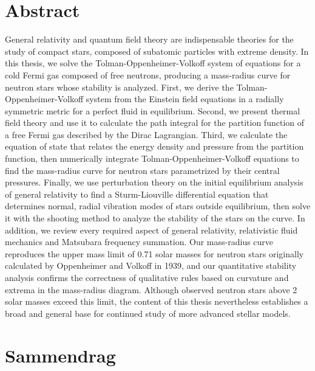 \chapter*{Abstract}

General relativity and quantum field theory are indispensable theories for the study of compact stars, composed of subatomic particles with extreme density.
In this thesis, we solve the Tolman-Oppenheimer-Volkoff system of equations for a cold Fermi gas composed of free neutrons, producing a mass-radius curve for neutron stars whose stability is analyzed.
First, we derive the Tolman-Oppenheimer-Volkoff system from the Einstein field equations in a radially symmetric metric for a perfect fluid in equilibrium.
Second, we present thermal field theory and use it to calculate the path integral for the partition function of a free Fermi gas described by the Dirac Lagrangian.
Third, we calculate the equation of state that relates the energy density and pressure from the partition function, then numerically integrate Tolman-Oppenheimer-Volkoff equations to find the mass-radius curve for neutron stars parametrized by their central pressures.
Finally, we use perturbation theory on the initial equilibrium analysis of general relativity to find a Sturm-Liouville differential equation that determines normal, radial vibration modes of stars outside equilibrium, then solve it with the shooting method to analyze the stability of the stars on the curve.
In addition, we review every required aspect of general relativity, relativistic fluid mechanics and Matsubara frequency summation. 
Our mass-radius curve reproduces the upper mass limit of 0.71 solar masses for neutron stars originally calculated by Oppenheimer and Volkoff in 1939, and our quantitative stability analysis confirms the correctness of qualitative rules based on curvature and extrema in the mass-radius diagram.
Although observed neutron stars above 2 solar masses exceed this limit, the content of this thesis nevertheless establishes a broad and general base for continued study of more advanced stellar models.

\chapter*{Sammendrag}

